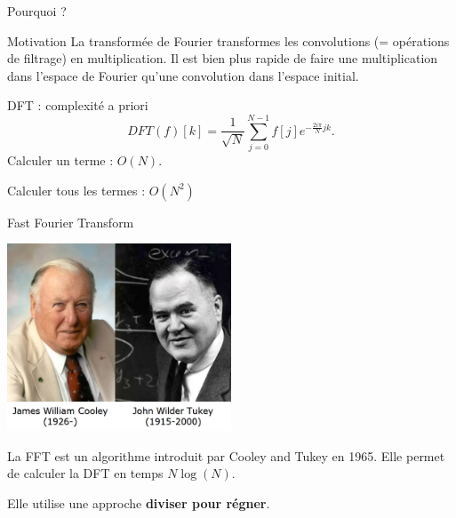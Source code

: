 \begin{frame}{Pourquoi ?}

\begin{block}{Motivation}
La transformée de Fourier transformes les convolutions (= opérations de filtrage) en multiplication. Il est bien plus rapide de faire une multiplication dans l'espace de Fourier qu'une convolution dans l'espace initial.
\end{block}



\end{frame}

\begin{frame}{DFT : complexité a priori}
\[DFT(f)[k] =  \frac{1}{\sqrt{N}}\sum_{j=0}^{N-1}f[j]e^{-\frac{2i\pi}{N} jk}.\]
Calculer un terme : $O(N)$.

\vspace{0.5cm}
Calculer tous les termes : $ O(N^2)$
\end{frame}

\begin{frame}{Fast Fourier Transform}

\begin{center}
\includegraphics[width=0.5\textwidth]{images/cooley_tukey.jpg}
\end{center}

La FFT est un algorithme introduit par Cooley and Tukey en 1965. Elle permet de calculer la DFT en temps $N \log(N)$.

Elle utilise une approche \textbf{diviser pour régner}.

\end{frame}

